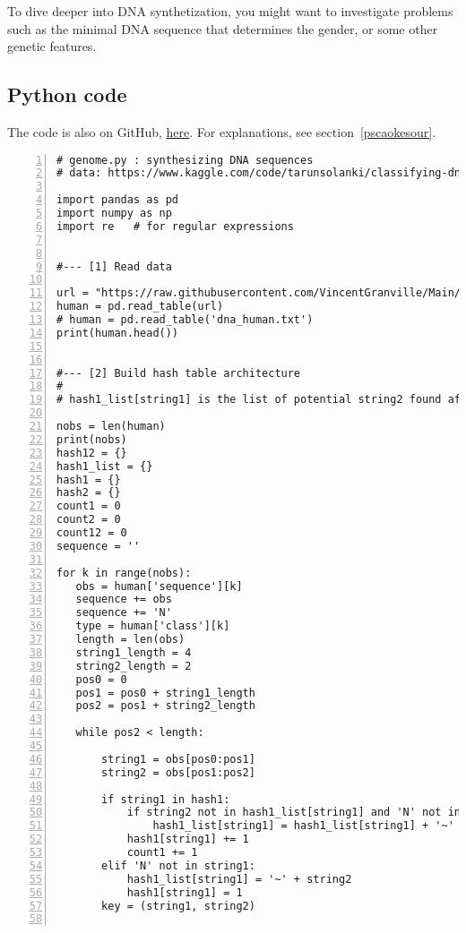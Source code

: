 \documentclass[oneside,10pt]{book}
\begin{document}
To dive deeper into DNA synthetization, you might want to investigate problems such as the minimal DNA sequence that determines the gender, or some other genetic features.

 

\subsection{Python code}\label{pupipr}

The code is also on GitHub, \href{https://github.com/VincentGranville/Main/blob/main/genome.py}{here}. For explanations,
 see section~\ref{pscaokesour}.
\vspace{1ex}

\begin{lstlisting}[numbers=left]
# genome.py : synthesizing DNA sequences
# data: https://www.kaggle.com/code/tarunsolanki/classifying-dna-sequence-using-ml

import pandas as pd
import numpy as np
import re   # for regular expressions


#--- [1] Read data

url = "https://raw.githubusercontent.com/VincentGranville/Main/main/dna_human.txt"
human = pd.read_table(url)
# human = pd.read_table('dna_human.txt')
print(human.head())


#--- [2] Build hash table architecture
#
# hash1_list[string1] is the list of potential string2 found after string1, separated by ~

nobs = len(human)
print(nobs)
hash12 = {}
hash1_list = {}
hash1 = {}
hash2 = {}
count1 = 0
count2 = 0
count12 = 0
sequence = ''

for k in range(nobs):
   obs = human['sequence'][k]
   sequence += obs
   sequence += 'N'
   type = human['class'][k]
   length = len(obs)
   string1_length = 4
   string2_length = 2
   pos0 = 0
   pos1 = pos0 + string1_length
   pos2 = pos1 + string2_length

   while pos2 < length:

       string1 = obs[pos0:pos1]
       string2 = obs[pos1:pos2]

       if string1 in hash1: 
           if string2 not in hash1_list[string1] and 'N' not in string2:
               hash1_list[string1] = hash1_list[string1] + '~' + string2
           hash1[string1] += 1
           count1 += 1
       elif 'N' not in string1:
           hash1_list[string1] = '~' + string2
           hash1[string1] = 1
       key = (string1, string2)


\end{lstlisting}
\end{document}
